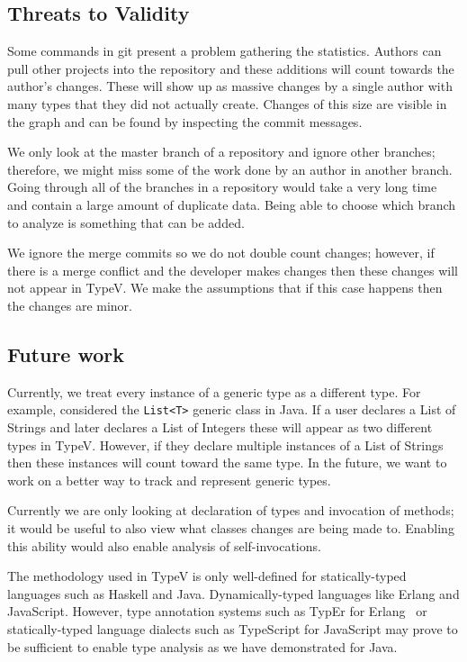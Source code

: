 \subsection{Threats to Validity}

Some commands in git present a problem gathering the statistics. Authors can pull other projects into the repository and these additions will count towards the author's changes. These will show up as massive changes by a single author with many types that they did not actually create. Changes of this size are visible in the graph and can be found by inspecting the commit messages.

We only look at the master branch of a repository and ignore other branches; therefore, we might miss some of the work done by an author in another branch. Going through all of the branches in a repository would take a very long time and contain a large amount of duplicate data. Being able to choose which branch to analyze is something that can be added.

We ignore the merge commits so we do not double count changes; however, if there is a merge conflict and the developer makes changes then these changes will not appear in TypeV. We make the assumptions that if this case happens then the changes are minor.

\subsection{Future work}

Currently, we treat every instance of a generic type as a different type. For example, considered the \texttt{List<T>} generic class in Java. If a user declares a List of Strings and later declares a List of Integers these will appear as two different types in TypeV. However, if they declare multiple instances of a List of Strings then these instances will count toward the same type. In the future, we want to work on a better way to track and represent generic types.

Currently we are only looking at declaration of types and invocation of methods; it would be useful to also view what classes changes are being made to. Enabling this ability would also enable analysis of self-invocations.

The methodology used in TypeV is only well-defined for statically-typed languages such as Haskell and Java. Dynamically-typed languages like Erlang and JavaScript. However, type annotation systems such as TypEr for Erlang~\cite{typer} or statically-typed language dialects such as TypeScript for JavaScript may prove to be sufficient to enable type analysis as we have demonstrated for Java. 

